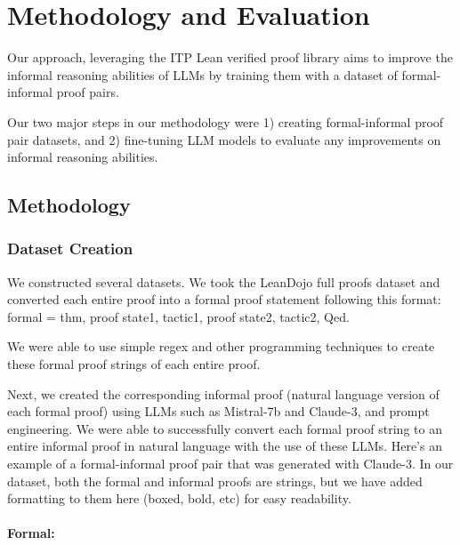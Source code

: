 \section{Methodology and Evaluation}

Our approach, leveraging the ITP Lean verified proof library aims to improve the informal reasoning abilities of LLMs by training them with a dataset of formal-informal proof pairs.

Our two major steps in our methodology were 1) creating formal-informal proof pair datasets, and 2) fine-tuning LLM models to evaluate any improvements on informal reasoning abilities.

\subsection{Methodology}

\subsubsection{Dataset Creation}

We constructed several datasets. We took the LeanDojo full proofs dataset and converted each entire proof into a formal proof statement following this format: formal = thm, proof state1, tactic1, proof state2, tactic2, Qed.

We were able to use simple regex and other programming techniques to create these formal proof strings of each entire proof.

Next, we created the corresponding informal proof (natural language version of each formal proof) using LLMs such as Mistral-7b and Claude-3, and prompt engineering. We were able to successfully convert each formal proof string to an entire informal proof in natural language with the use of these LLMs. Here's an example of a formal-informal proof pair that was generated with Claude-3. In our dataset, both the formal and informal proofs are strings, but we have added formatting to them here (boxed, bold, etc) for easy readability.

\paragraph{Formal:}


